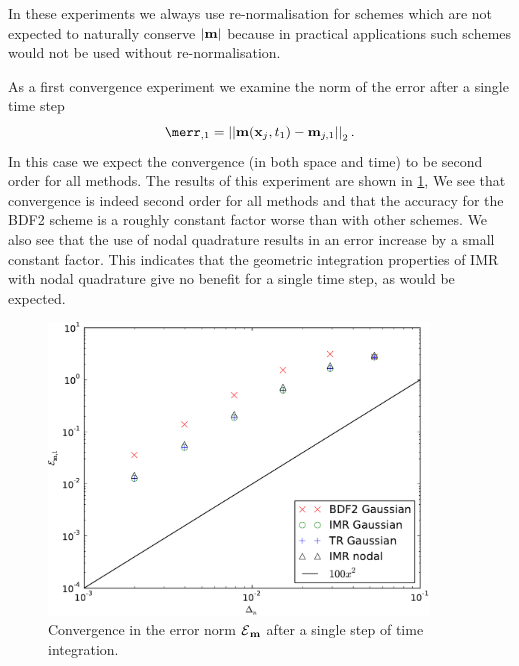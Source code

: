 In these experiments we always use re-normalisation for schemes which are not expected to naturally conserve $\left|{\boldsymbol{\mathrm{m}}} \right|$ because in practical applications such schemes would not be used without re-normalisation.

As a first convergence experiment we examine the norm of the error after a single time step
\begin{equation}
  \merr_{,1} = \norm{\mv(\xv_j, t_1) - \mv_{j,1}}_2.
\end{equation}
In this case we expect the convergence (in both space and time) to be second order for all methods.
The results of this experiment are shown in \cref{fig:convergence-one-step},
We see that convergence is indeed second order for all methods and that the accuracy for the BDF2 scheme is a roughly constant factor worse than with other schemes.
We also see that the use of nodal quadrature results in an error increase by a small constant factor.
This indicates that the geometric integration properties of IMR with nodal quadrature give no benefit for a single time step, as would be expected.
\begin{figure}
  \centering
  \includegraphics[width=0.9\textwidth]{plots/2d_wave_solution_convergence_long_time/firstoferrornormsvsfakemeanofdts.pdf}
  \caption{Convergence in the error norm $\mathcal{E}{}_{\boldsymbol{\mathrm{m}}}{}$ after a single step of time integration.}
  \label{fig:convergence-one-step}
\end{figure}



